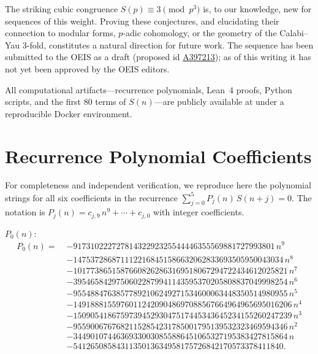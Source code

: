 \documentclass[11pt, a4paper]{article}
\begin{document}
The striking cubic congruence $S(p)\equiv 3\pmod{p^3}$ is, to our
knowledge, new for sequences of this weight.  Proving these conjectures,
and elucidating their connection to modular forms, $p$-adic cohomology, or
the geometry of the Calabi--Yau 3-fold, constitutes a natural direction for
future work.  The sequence has been submitted to the OEIS as a draft (proposed id \href{https://oeis.org/draft/A397213}{A397213}); as of this writing it has not yet been approved by the OEIS editors.

All computational artifacts---recurrence polynomials, Lean~4 proofs,
Python scripts, and the first 80 terms of $S(n)$---are publicly available
at \cite{repo} under a reproducible Docker environment.


\appendix
\section{Recurrence Polynomial Coefficients}\label{app:recurrence}

For completeness and independent verification, we reproduce here the
polynomial strings for all six coefficients in the recurrence
$\sum_{j=0}^5 P_j(n)\,S(n+j)=0$.  The notation is
$P_j(n)=c_{j,9}\,n^9+\cdots+c_{j,0}$ with integer coefficients.

\medskip\noindent
\textbf{$P_0(n)$}:
\begin{align*}
  P_0(n) =\; &
    {-}91731022272781432292325544446355569881727993801\,n^9 \\
  & {-}1475372868711122168451586632062833693505950043034\,n^8 \\
  & {-}10177386515876608262863169518067294722434612025821\,n^7 \\
  & {-}39546584297506022879941143595370205808837049998254\,n^6 \\
  & {-}95548847638577892106249271534600063448350514980955\,n^5 \\
  & {-}149188815597601124209048697088567664964965695016206\,n^4 \\
  & {-}150905418675973945293047517445343645234155260247239\,n^3 \\
  & {-}95590067676821152854231785001795139532323469594346\,n^2 \\
  & {-}34490107446369330030855886451065327195383427815864\,n \\
  & {-}5412650858431135013634958175726842170573378411840.
\end{align*}
\end{document}
